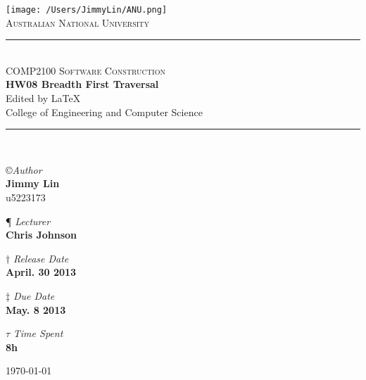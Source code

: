 \documentclass[11pt,a4paper]{article}
\newcommand{\AUTHOR}{Jimmy Lin}
\newcommand{\UID}{u5223173}
\newcommand{\UNIVERSITY}{Australian National University}
\newcommand{\COLLEGE}{College of Engineering and Computer Science}
\newcommand{\COURSE}{COMP2100 Software Construction}
\newcommand{\LECTURER}{Chris Johnson}
\newcommand{\TASK}{HW08 Breadth First Traversal}
\newcommand{\RELEASEDATE}{April. 30 2013}
\newcommand{\DUEDATE}{May. 8 2013}
\newcommand{\TIMECONSUME}{8h}
\begin{document}
\begin{titlepage}
    \begin{center}
        \vspace*{0.8cm}
\texttt{[image: /Users/JimmyLin/ANU.png]}\\[1cm]
\textsc{\LARGE \UNIVERSITY}\\[1.5cm]

\rule{\linewidth}{0.5mm} \\[0.4cm]
{ \textsc{\Large \COURSE}\\[0.5cm]
 \huge \bfseries \TASK}\\[0.4cm]
 \footnotesize Edited by \LaTeX \\[0.25cm]
 \normalsize{\COLLEGE}
\rule{\linewidth}{0.5mm} \\[1.5cm]

\begin{center}
\copyright \emph{\large Author} \\
\Large \textbf{\AUTHOR} \\ \UID \vspace*{0.6cm}

\P \emph{ Lecturer} \\
\Large \textbf{\LECTURER} \vspace*{0.6cm}

$\dagger$ \emph{Release Date}  \\
\Large \textbf{\RELEASEDATE} \vspace*{0.6cm} 

$\ddagger$ \emph{Due Date}  \\
\Large \textbf{\DUEDATE} \vspace*{0.6cm}

$\tau$ \emph{Time Spent} \\
\Large \textbf{\TIMECONSUME} \vspace*{0.6cm} 
\end{center}
\vfill
{\large \today}
\end{center}
\end{titlepage}

\begin{center} \tableofcontents \end{center}
 \newpage
\end{document}
